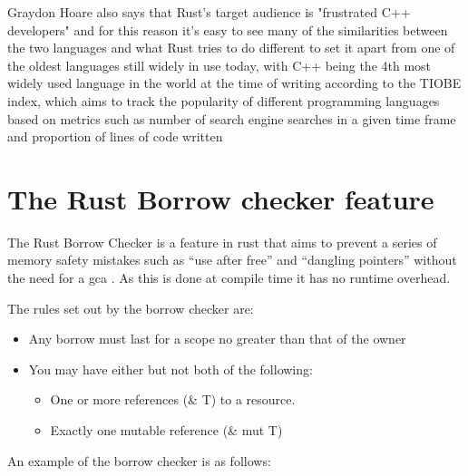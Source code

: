 \documentclass{article}
\begin{document}
Graydon Hoare also says that Rust's target audience is "frustrated C++ developers" \cite{rust-interview} and for this reason it's easy to see many of the similarities between the two languages and what Rust tries to do different to set it apart from one of the oldest languages still widely in use today, with C++ being the 4th most widely used language in the world at the time of writing according to the TIOBE index, which aims to track the popularity of different programming languages based on metrics such as number of search engine searches in a given time frame and proportion of lines of code written \cite{tiobe-index}

\section{The Rust Borrow checker feature}
The Rust Borrow Checker is a feature in rust that aims to prevent a series of memory safety mistakes such as ``use after free'' and ``dangling pointers'' without the need for a \gls{gca} \parencite{memory_safety_in_rust}. As this is done at compile time it has no runtime overhead.

The rules set out by the borrow checker are:
\begin{itemize}\label{rust:borrow_checker_rules}
	\item{Any borrow must last for a scope no greater than that of the owner}
	\item You may have either but not both of the following:
	      \begin{itemize}
		      \item One or more references (\& T) to a resource.
		      \item Exactly one mutable reference (\& mut T)
	      \end{itemize}
\end{itemize}

An example of the borrow checker is as follows:
\end{document}
